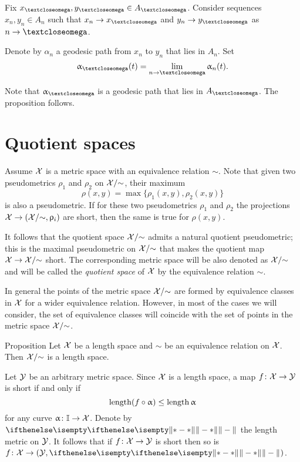 Fix $x_\o,y_\o\in A_\o$.
Consider sequences $x_n,y_n\in A_n$ such that $x_n\to x_\o$ and $y_n\to y_\o$ as $n\to\o$.

Denote by $\alpha_n$ a geodesic path from $x_n$ to $y_n$ that lies in $A_n$.
Set
\[\alpha_\o(t)=\lim_{n\to \o}\alpha_n(t).\]

Note that $\alpha_\o$ is a geodesic path that lies in $A_\o$.
The proposition follows.
\qeds






\section{Quotient spaces}\label{sec:quotient}

 Assume $\mathcal{X}$ is a metric space
with an equivalence relation $\sim$.
Note that given two pseudometrics $\rho_1$ and $\rho_2$ on $\mathcal{X}/{\sim}$,
their maximum 
\[\rho(x,y)=\max\{\rho_1(x,y),\rho_2(x,y)\}\]
is also a pseudometric.
If for these two pseudometrics $\rho_1$ and $\rho_2$ the projections $\spc{X}\to(\spc{X}/{\sim},\rho_i)$ are short, then the same is true for $\rho(x,y)$.

It follows that 
the quotient space $\mathcal{X}/{\sim}$ admits a natural quotient pseudometric;
this is the maximal pseudometric on  $\mathcal{X}/{\sim}$ 
that makes the quotient map 
$\spc{X}\to\spc{X}/{\sim}$ short.
The corresponding metric space will be also denoted as $\mathcal{X}/{\sim}$
and will be called the \emph{quotient space} of $\mathcal{X}$ by the equivalence relation $\sim$.

In general  the points of the metric space $\mathcal{X}/{\sim}$
are formed by equivalence classes in $\mathcal{X}$
for a wider equivalence relation.
However, in  most of the cases we will consider, 
the set of equivalence classes will coincide with the set of points in the metric space $\mathcal{X}/{\sim}$.



\begin{thm}{Proposition}\label{prop:length-X}
Let $\mathcal{X}$ be a length space and 
$\sim$ be an equivalence relation on $\mathcal{X}$. Then $\mathcal{X}/{\sim}$
is a length space.
\end{thm}

Let $\mathcal{Y}$ be an arbitrary metric space.
Since $\mathcal{X}$ is a length space,
a map $f\:\spc{X}\to \spc{Y}$ is short if and only if 
\[\length(f\circ\alpha)\le \length\alpha\]
for any curve
$\alpha\:\II\to \spc{X}$.
Denote by $\yetdist{}{}{}$ the length metric on $\mathcal{Y}$.
It follows that if $f\:\spc{X}\to \spc{Y}$ is short
then so is 
$f\:\spc{X}\to (\spc{Y},\yetdist{}{}{})$.


